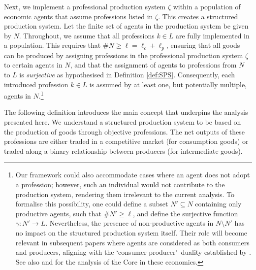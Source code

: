\documentclass[11pt,fleqn]{article}
\begin{document}
Next, we implement a professional production system $\zeta$ within a population of economic agents that assume professions listed in $\zeta$. This creates a structured production system. Let the finite set of agents in the production system be given by $N$. Throughout, we assume that all professions $k \in L$ are fully implemented in a population. This requires that $\#N \geqslant \ell = \ell_c + \ell_p$, ensuring that all goods can be produced by assigning professions in the professional production system $\zeta$ to certain agents in $N$, and that the assignment of agents to professions from $N$ to $L$ is \emph{surjective} as hypothesised in Definition \ref{def:SPS}. Consequently, each introduced profession $k \in L$ is assumed by at least one, but potentially multiple, agents in $N$.\footnote{Our framework could also accommodate cases where an agent does not adopt a profession; however, such an individual would not contribute to the production system, rendering them irrelevant to the current analysis. To formalise this possibility, one could define a subset $N' \subseteq N$ containing only productive agents, such that $\# N' \geqslant \ell$, and define the surjective function $\gamma: N' \to L$. Nevertheless, the presence of non-productive agents in $N \setminus N'$ has no impact on the structured production system itself. Their role will become relevant in subsequent papers where agents are considered as both consumers and producers, aligning with the \lq consumer-producer\rq\ duality established by \citet{SDL2019}. See also \citet{SDL2020-JEBO} and \citet{SDL2019Core} for the analysis of the Core in these economies.  }

The following definition introduces the main concept that underpins the analysis presented here. We understand a structured production system to be based on the production of goods through objective professions. The net outputs of these professions are either traded in a competitive market (for consumption goods) or traded along a binary relationship between producers (for intermediate goods). 
\end{document}
